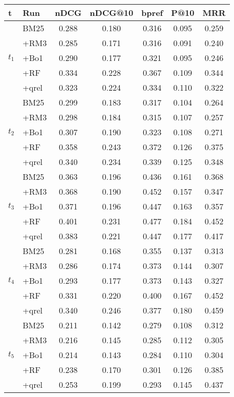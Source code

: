 \begin{tabular}{llccccc}
    \toprule
    t & Run & nDCG & nDCG@10 & bpref & P@10 & MRR \\
    \midrule
    \multirow[c]{5}{*}{$t_1$}  & BM25 & 0.288 & 0.180 & 0.316 & 0.095 & 0.259 \\
     & +RM3 & 0.285 & 0.171 & 0.316 & 0.091 & 0.240 \\
     & +Bo1 & 0.290 & 0.177 & 0.321 & 0.095 & 0.246 \\
     & +RF & 0.334 & 0.228 & 0.367 & 0.109 & 0.344 \\
     & +qrel & 0.323 & 0.224 & 0.334 & 0.110 & 0.322 \\  \midrule

    \multirow[c]{5}{*}{$t_2$}  & BM25 & 0.299 & 0.183 & 0.317 & 0.104 & 0.264 \\
     & +RM3 & 0.298 & 0.184 & 0.315 & 0.107 & 0.257 \\
     & +Bo1 & 0.307 & 0.190 & 0.323 & 0.108 & 0.271 \\
     & +RF & 0.358 & 0.243 & 0.372 & 0.126 & 0.375 \\
     & +qrel & 0.340 & 0.234 & 0.339 & 0.125 & 0.348 \\\midrule

    \multirow[c]{5}{*}{$t_3$}  & BM25 & 0.363 & 0.196 & 0.436 & 0.161 & 0.368 \\ 
     & +RM3 & 0.368 & 0.190 & 0.452 & 0.157 & 0.347 \\
     & +Bo1 & 0.371 & 0.196 & 0.447 & 0.163 & 0.357 \\
     & +RF & 0.401 & 0.231 & 0.477 & 0.184 & 0.452 \\
     & +qrel & 0.383 & 0.221 & 0.447 & 0.177 & 0.417 \\\midrule

    \multirow[c]{5}{*}{$t_4$}  & BM25 & 0.281 & 0.168 & 0.355 & 0.137 & 0.313 \\ 
     & +RM3 & 0.286 & 0.174 & 0.373 & 0.144 & 0.307 \\
     & +Bo1 & 0.293 & 0.177 & 0.373 & 0.143 & 0.327 \\
     & +RF & 0.331 & 0.220 & 0.400 & 0.167 & 0.452 \\
     & +qrel & 0.340 & 0.246 & 0.377 & 0.180 & 0.459 \\\midrule

    \multirow[c]{5}{*}{$t_5$}  & BM25 & 0.211 & 0.142 & 0.279 & 0.108 & 0.312 \\ 
     & +RM3 & 0.216 & 0.145 & 0.285 & 0.112 & 0.305 \\
     & +Bo1 & 0.214 & 0.143 & 0.284 & 0.110 & 0.304 \\
     & +RF & 0.238 & 0.170 & 0.301 & 0.126 & 0.385 \\
     & +qrel & 0.253 & 0.199 & 0.293 & 0.145 & 0.437 \\
    \bottomrule
    \end{tabular}
    